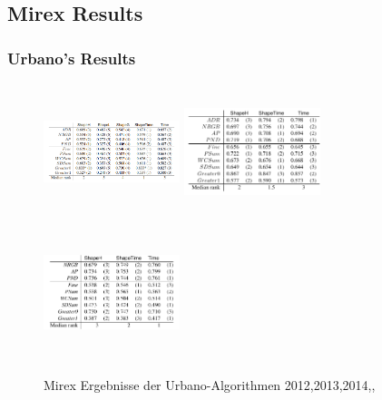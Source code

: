 \documentclass{beamer}
\begin{document}
    \subsection{Mirex Results}
     	\begin{frame}
 			\frametitle{Urbano's Results}
 
 			\begin{figure}[h!]
 				\includegraphics[width=150px,height=150px,keepaspectratio]{urbano_mirex_2012_results}
 				\includegraphics[width=150px,height=150px,keepaspectratio]{urbano_mirex_2013_results}
 				\includegraphics[width=150px,height=150px,keepaspectratio]{urbano_mirex_2014_results}
 				
 				\caption{Mirex Ergebnisse der Urbano-Algorithmen 2012,2013,2014\cite{five_point_two},\cite{five_point_three},\cite{five_point_four}}
 			\end{figure}
 		\end{frame}

	
\end{document}
